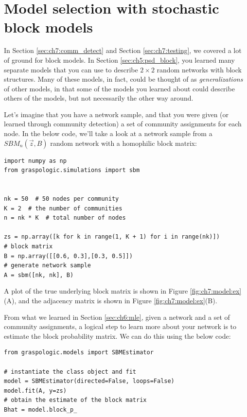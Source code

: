\section{Model selection with stochastic block models}
\label{sec:ch7:modelselect}

In Section \ref{sec:ch7:comm_detect} and Section \ref{sec:ch7:testing}, we covered a lot of ground for block models. In Section \ref{sec:ch5:psd_block}, you learned many separate models that you can use to describe $2 \times 2$ random networks with block structures. Many of these models, in fact, could be thought of as \textit{generalizations} of other models, in that some of the models you learned about could describe others of the models, but not necessarily the other way around. 

Let's imagine that you have a network sample, and that you were given (or learned through community detection) a set of community assignments for each node. In the below code, we'll take a look at a network sample from a $SBM_n(\vec z, B)$ random network with a homophilic block matrix:

\begin{lstlisting}[style=python]
import numpy as np
from graspologic.simulations import sbm


nk = 50  # 50 nodes per community
K = 2  # the number of communities
n = nk * K  # total number of nodes

zs = np.array([k for k in range(1, K + 1) for i in range(nk)])
# block matrix
B = np.array([[0.6, 0.3],[0.3, 0.5]])
# generate network sample
A = sbm([nk, nk], B)
\end{lstlisting}

A plot of the true underlying block matrix is shown in Figure \ref{fig:ch7:model:ex}(A), and the adjacency matrix is shown in Figure \ref{fig:ch7:model:ex}(B).

From what we learned in Section \ref{sec:ch6:mle}, given a network and a set of community assignments, a logical step to learn more about your network is to estimate the block probability matrix. We can do this using the below code:

\begin{lstlisting}[style=python]
from graspologic.models import SBMEstimator

# instantiate the class object and fit
model = SBMEstimator(directed=False, loops=False)
model.fit(A, y=zs)
# obtain the estimate of the block matrix
Bhat = model.block_p_
\end{lstlisting}

